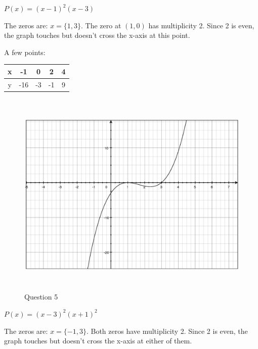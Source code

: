 \documentclass[fleqn,addpoints]{exam}
\begin{document}
\begin{questions}
\begin{solution}
\end{solution}

\ifprintanswers
\pagebreak
\else
\fi

\question $P(x) = (x-1)^2(x-3)$

\begin{solution}

The zeros are: $x = \{1, 3\}$.  The zero at $(1, 0)$ has multiplicity 2.  Since 2 is even, the graph touches but doesn't
cross the x-axis at this point.

A few points:
\begin{tabular}{|c|c|c|c|c|}
\hline
  x & -1  &  0 &  2 & 4 \\
\hline
  y & -16 & -3 & -1 & 9 \\
\hline
\end{tabular}

\begin{figure}[H]
  \centering
  \includegraphics[width=14cm,height=10cm]{question_5.eps}
  \caption*{Question 5}
\end{figure}

\end{solution}

\ifprintanswers
\pagebreak
\else
\fi

\question $P(x) = (x-3)^2(x+1)^2$
\label{graph:last} 

\begin{solution}

The zeros are: $x = \{-1, 3\}$.  Both zeros have multiplicity 2.  Since 2 is even, the graph touches but doesn't
cross the x-axis at either of them.  


\end{solution}
\end{questions}
\end{document}
